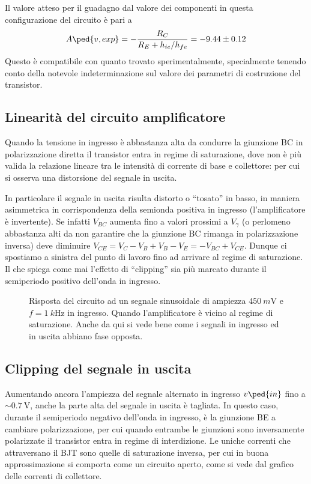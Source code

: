 \documentclass[10pt,a4paper]{article}
\begin{document}
Il valore atteso per il guadagno dal valore dei componenti in questa
configurazione del circuito è pari a
\[
A\ped{v, exp} = -\frac{R_C}{R_E + h_{ie}/h_{fe}} = -9.44 \pm 0.12
\]
Questo è compatibile con quanto trovato sperimentalmente, specialmente
tenendo conto della notevole indeterminazione sul valore dei parametri di
costruzione del transistor.

\subsection{Linearità del circuito amplificatore}
Quando la tensione in ingresso è abbastanza alta da condurre la giunzione
BC in polarizzazione diretta il transistor entra in regime di saturazione,
dove non è più valida la relazione lineare tra le intensità di corrente di
base e collettore: per cui si osserva una distorsione del segnale in uscita.

In particolare il segnale in uscita risulta distorto o ``tosato'' in basso,
in maniera asimmetrica in corrispondenza della semionda positiva in ingresso
(l'amplificatore è invertente). Se infatti $V_{BC}$ aumenta fino a valori
prossimi a $V_\gamma$ (o perlomeno abbastanza alti da non garantire che la
giunzione BC rimanga in polarizzazione inversa) deve diminuire
$V_{CE} = V_C - V_B + V_B - V_E = -V_{BC} + V_{CE}$. Dunque ci spostiamo a
sinistra del punto di lavoro fino ad arrivare al regime di saturazione.
Il che spiega come mai l'effetto di ``clipping'' sia più marcato durante
il semiperiodo positivo dell'onda in ingresso.

\begin{figure}[htb]
\centering
\caption{Risposta del circuito ad un segnale sinusoidale di ampiezza
$\SI{450}{m\V}$ e $f = \SI{1}{k\Hz}$ in ingresso. Quando l'amplificatore
è vicino al regime di saturazione. Anche da qui si vede bene come i segnali
in ingresso ed in uscita abbiano fase opposta. \label{fig: Asat}}
\end{figure}


\subsection{Clipping del segnale in uscita}
Aumentando ancora l'ampiezza del segnale alternato in ingresso $v\ped{in}$ fino
a $\sim \SI{0.7}{\V}$, anche la parte alta del segnale in uscita è tagliata.
In questo caso, durante il semiperiodo negativo dell'onda in ingresso, è la
giunzione BE a cambiare polarizzazione, per cui quando entrambe le giunzioni
sono inversamente polarizzate il transistor entra in regime di interdizione.
Le uniche correnti che attraversano il BJT sono quelle di saturazione inversa,
per cui in buona approssimazione si comporta come un circuito aperto, come si
vede dal grafico delle correnti di collettore.
\end{document}
